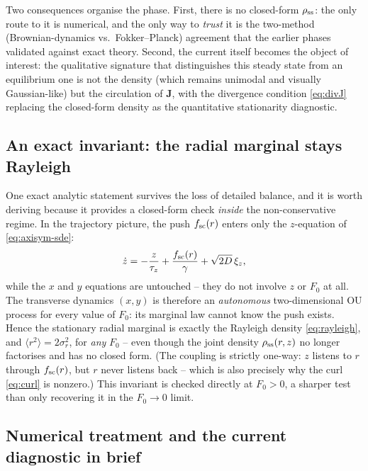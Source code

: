 \documentclass[11pt]{article}
\newcommand{\avg}[1]{\langle #1 \rangle}
\begin{document}
Two consequences organise the phase. First, there is no closed-form $\rho_{\rm ss}$: the only route to it is numerical, and the only way to \emph{trust} it is the two-method (Brownian-dynamics vs.\ Fokker--Planck) agreement that the earlier phases validated against exact theory. Second, the current itself becomes the object of interest: the qualitative signature that distinguishes this steady state from an equilibrium one is not the density (which remains unimodal and visually Gaussian-like) but the circulation of $\mathbf J$, with the divergence condition \eqref{eq:divJ} replacing the closed-form density as the quantitative stationarity diagnostic.

\subsection{An exact invariant: the radial marginal stays Rayleigh}
\label{sec:rayleigh-invariant}

One exact analytic statement survives the loss of detailed balance, and it is worth deriving because it provides a closed-form check \emph{inside} the non-conservative regime. In the trajectory picture, the push $f_{\rm sc}(r)$ enters only the $z$-equation of \eqref{eq:axisym-sde}:
\begin{equation}
\dot z = -\frac{z}{\tau_z} + \frac{f_{\rm sc}(r)}{\gamma} + \sqrt{2D}\,\xi_z,
\end{equation}
while the $x$ and $y$ equations are untouched -- they do not involve $z$ or $F_0$ at all. The transverse dynamics $(x,y)$ is therefore an \emph{autonomous} two-dimensional OU process for every value of $F_0$: its marginal law cannot know the push exists. Hence the stationary radial marginal is exactly the Rayleigh density \eqref{eq:rayleigh}, and $\avg{r^2} = 2\sigma_r^2$, for \emph{any} $F_0$ -- even though the joint density $\rho_{\rm ss}(r,z)$ no longer factorises and has no closed form. (The coupling is strictly one-way: $z$ listens to $r$ through $f_{\rm sc}(r)$, but $r$ never listens back -- which is also precisely why the curl \eqref{eq:curl} is nonzero.) This invariant is checked directly at $F_0>0$, a sharper test than only recovering it in the $F_0\to0$ limit.

\subsection{Numerical treatment and the current diagnostic in brief}
\end{document}
